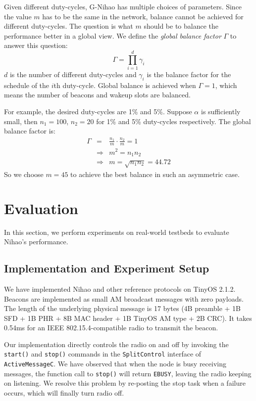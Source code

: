 \documentclass[conference]{IEEEtran}
\begin{document}
Given different duty-cycles, G-Nihao has multiple choices of parameters.
Since the value $m$ has to be the same in the network, balance cannot be achieved for different duty-cycles.
The question is what $m$ should be to balance the performance better in a global view.
We define the \emph{global balance factor} $\Gamma$ to answer this question:
\begin{displaymath}
    \Gamma = \prod_{i=1}^{d} \gamma_i
\end{displaymath}
$d$ is the number of different duty-cycles and $\gamma_i$ is the balance factor for the schedule of the $i$th duty-cycle.
Global balance is achieved when $\Gamma=1$, which means the number of beacons and wakeup slots are balanced.

For example, the desired duty-cycles are 1\% and 5\%.
Suppose $\alpha$ is sufficiently small, then $n_1=100$, $n_2=20$ for 1\% and 5\% duty-cycles respectively.
The global balance factor is:
\begin{eqnarray}
    \Gamma & = & \frac{n_1}{m} \cdot \frac{n_2}{m} = 1 \nonumber \\
           & \Rightarrow & m^2 = n_1 n_2 \nonumber \\
           & \Rightarrow & m = \sqrt{n_1 n_2} = 44.72 \nonumber
\end{eqnarray}
So we choose $m=45$ to achieve the best balance in such an asymmetric case.


\section{Evaluation}\label{evaluation}
In this section, we perform experiments on real-world testbeds to evaluate Nihao's performance.

\subsection{Implementation and Experiment Setup}
We have implemented Nihao and other reference protocols on TinyOS 2.1.2.
Beacons are implemented as small AM broadcast messages with zero payloads.
The length of the underlying physical message is 17 bytes (4B preamble + 1B SFD + 1B PHR + 8B MAC header + 1B TinyOS AM type + 2B CRC).
It takes 0.54ms for an IEEE 802.15.4-compatible radio to transmit the beacon.

Our implementation directly controls the radio on and off by invoking 
the \texttt{start()} and \texttt{stop()} commands in the \texttt{SplitControl} interface of \texttt{ActiveMessageC}.
We have observed that when the node is busy receiving messages,
the function call to \texttt{stop()} will return \texttt{EBUSY}, leaving the radio keeping on listening.
We resolve this problem by re-posting the stop task when a failure occurs, which will finally turn radio off.
\end{document}

